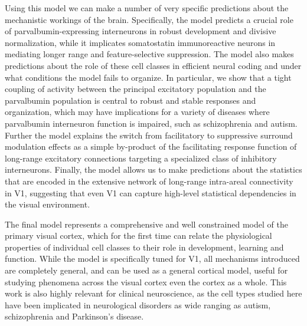 Using this model we can make a number of very specific predictions
about the mechanistic workings of the brain. Specifically, the model
predicts a crucial role of parvalbumin-expressing interneurons in
robust development and divisive normalization, while it implicates
somatostatin immunoreactive neurons in mediating longer range and
feature-selective suppression. The model also makes predictions about
the role of these cell classes in efficient neural coding and under
what conditions the model fails to organize. In particular, we show
that a tight coupling of activity between the principal excitatory
population and the parvalbumin population is central to robust and
stable responses and organization, which may have implications for a
variety of diseases where parvalbumin interneuron function is
impaired, such as schizophrenia and autism. Further the model explains
the switch from facilitatory to suppressive surround modulation
effects as a simple by-product of the facilitating response function
of long-range excitatory connections targeting a specialized class of
inhibitory interneurons. Finally, the model allows us to make
predictions about the statistics that are encoded in the extensive
network of long-range intra-areal connectivity in V1, suggesting that
even V1 can capture high-level statistical dependencies in the visual
environment.

The final model represents a comprehensive and well constrained model
of the primary visual cortex, which for the first time can relate the
physiological properties of individual cell classes to their role in
development, learning and function. While the model is specifically
tuned for V1, all mechanisms introduced are completely general, and
can be used as a general cortical model, useful for studying phenomena
across the visual cortex even the cortex as a whole. This work is also
highly relevant for clinical neuroscience, as the cell types studied
here have been implicated in neurological disorders as wide ranging as
autism, schizophrenia and Parkinson's disease.
\endgroup
